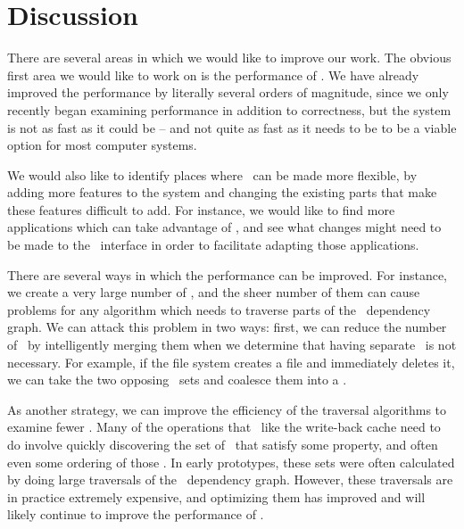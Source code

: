 \section {Discussion}
\label{sec:discussion}

There are several areas in which we would like to improve our work. The obvious
first area we would like to work on is the performance of \Kudos. We have
already improved the performance by literally several orders of magnitude, since
we only recently began examining performance in addition to correctness, but the
system is not as fast as it could be -- and not quite as fast as it needs to be
to be a viable option for most computer systems.

We would also like to identify places where \Kudos\ can be made more flexible,
by adding more features to the system and changing the existing parts that make
these features difficult to add. For instance, we would like to find more
applications which can take advantage of \opgroups, and see what changes might
need to be made to the \opgroup\ interface in order to facilitate adapting those
applications.

There are several ways in which the performance can be improved. For instance,
we create a very large number of \chdescs, and the sheer number of them can
cause problems for any algorithm which needs to traverse parts of the \chdesc\
dependency graph. We can attack this problem in two ways: first, we can reduce
the number of \chdescs\ by intelligently merging them when we determine that
having separate \chdescs\ is not necessary. For example, if the file system
creates a file and immediately deletes it, we can take the two opposing
\chdescs\ sets and coalesce them into a \noop.

As another strategy, we can improve the efficiency of the traversal algorithms
to examine fewer \chdescs. Many of the operations that \modules\ like the
write-back cache need to do involve quickly discovering the set of \chdescs\
that satisfy some property, and often even some ordering of those \chdescs. In
early prototypes, these sets were often calculated by doing large traversals of
the \chdesc\ dependency graph. However, these traversals are in practice
extremely expensive, and optimizing them has improved and will likely continue
to improve the performance of \Kudos.


